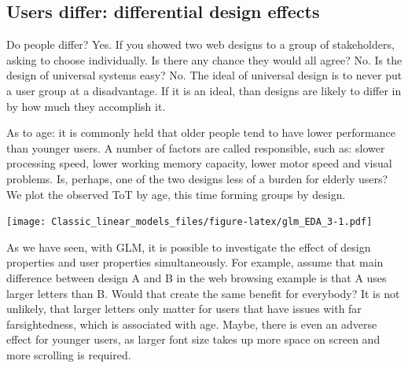 \documentclass[]{svmono}
\newenvironment{Shaded}{\begin{snugshade}}{\end{snugshade}}
\newcommand{\KeywordTok}[1]{\textcolor[rgb]{0.13,0.29,0.53}{\textbf{#1}}}
\newcommand{\DataTypeTok}[1]{\textcolor[rgb]{0.13,0.29,0.53}{#1}}
\newcommand{\StringTok}[1]{\textcolor[rgb]{0.31,0.60,0.02}{#1}}
\newcommand{\OperatorTok}[1]{\textcolor[rgb]{0.81,0.36,0.00}{\textbf{#1}}}
\newcommand{\NormalTok}[1]{#1}
\theoremstyle{definition}
\theoremstyle{definition}
\theoremstyle{definition}
\theoremstyle{remark}
\begin{document}
\subsection{Users differ: differential design
effects}\label{differential_design_effects}

Do people differ? Yes. If you showed two web designs to a group of
stakeholders, asking to choose individually. Is there any chance they
would all agree? No. Is the design of universal systems easy? No. The
ideal of universal design is to never put a user group at a
disadvantage. If it is an ideal, than designs are likely to differ in by
how much they accomplish it.

As to age: it is commonly held that older people tend to have lower
performance than younger users. A number of factors are called
responsible, such as: slower processing speed, lower working memory
capacity, lower motor speed and visual problems. Is, perhaps, one of the
two designs less of a burden for elderly users? We plot the observed ToT
by age, this time forming groups by design.

\begin{Shaded}
\end{Shaded}

\texttt{[image: Classic\_linear\_models\_files/figure-latex/glm\_EDA\_3-1.pdf]}

As we have seen, with GLM, it is possible to investigate the effect of
design properties and user properties simultaneously. For example,
assume that main difference between design A and B in the web browsing
example is that A uses larger letters than B. Would that create the same
benefit for everybody? It is not unlikely, that larger letters only
matter for users that have issues with far farsightedness, which is
associated with age. Maybe, there is even an adverse effect for younger
users, as larger font size takes up more space on screen and more
scrolling is required.
\end{document}
